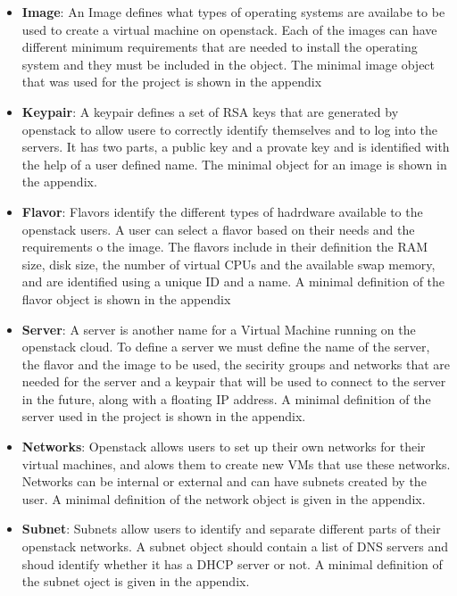 \begin{itemize}
\item \textbf{Image}: An Image defines what types of operating systems are
availabe to be used to create a virtual machine on openstack. Each of
the images can have different minimum requirements that are needed to
install the operating system and they must be included in the
object. The minimal image object that was used for the project is
shown in the appendix

\item \textbf{Keypair}: A keypair defines a set of RSA keys that are
generated by openstack to allow usere to correctly identify themselves
and to log into the servers. It has two parts, a public key and a
provate key and is identified with the help of a user defined
name. The minimal object for an image is shown in the appendix.

\item \textbf{Flavor}: Flavors identify the different types of hadrdware
available to the openstack users. A user can select a flavor based on
their needs and the requirements o the image. The flavors include in
their definition the RAM size, disk size, the number of virtual CPUs
and the available swap memory, and are identified using a unique ID
and a name.  A minimal definition of the flavor object is shown in the
appendix

\item \textbf{Server}: A server is another name for a Virtual Machine
running on the openstack cloud. To define a server we must define the
name of the server, the flavor and the image to be used, the secirity
groups and networks that are needed for the server and a keypair that
will be used to connect to the server in the future, along with a
floating IP address. A minimal definition of the server used in the
project is shown in the appendix.

\item \textbf{Networks}: Openstack allows users to set up their own
networks for their virtual machines, and alows them to create new VMs
that use these networks. Networks can be internal or external and can
have subnets created by the user. A minimal definition of the network
object is given in the appendix.

\item \textbf{Subnet}: Subnets allow users to identify and separate
different parts of their openstack networks. A subnet object should
contain a list of DNS servers and shoud identify whether it has a DHCP
server or not.  A minimal definition of the subnet oject is given in
the appendix.
\end{itemize}



 
